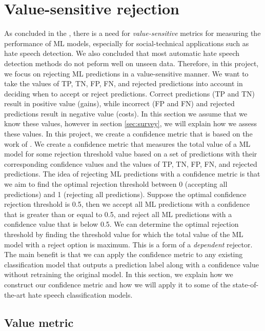 \chapter{Value-sensitive rejection}
As concluded in the , there is a need for \textit{value-sensitive} metrics for measuring the performance of ML models, especially for social-technical applications such as hate speech detection.
%
We also concluded that most automatic hate speech detection methods do not peform well on unseen data.
%
Therefore, in this project, we focus on rejecting ML predictions in a value-sensitive manner.
%
We want to take the values of TP, TN, FP, FN, and rejected predictions into account in deciding when to accept or reject predictions.
%
Correct predictions (TP and TN) result in positive value (gains), while incorrect (FP and FN) and rejected predictions result in negative value (costs).
%
In this section we assume that we know these values, however in section \ref{sec:survey}, we will explain how we assess these values.
%
In this project, we create a confidence metric that is based on the work of \citet{de2000reject}.
%
We create a confidence metric that measures the total value of a ML model for some rejection threshold value based on a set of predictions with their corresponding confidence values and the values of TP, TN, FP, FN, and rejected predictions.
%
The idea of rejecting ML predictions with a confidence metric is that we aim to find the optimal rejection threshold between 0 (accepting all predictions) and 1 (rejecting all predictions).
%
Suppose the optimal confidence rejection threshold is 0.5, then we accept all ML predictions with a confidence that is greater than or equal to 0.5, and reject all ML predictions with a confidence value that is below 0.5.
%
We can determine the optimal rejection threshold by finding the threshold value for which the total value of the ML model with a reject option is maximum.
%
This is a form of a \textit{dependent} rejector.
%
The main benefit is that we can apply the confidence metric to any existing classification model that outputs a prediction label along with a confidence value without retraining the original model.
%
In this section, we explain how we construct our confidence metric and how we will apply it to some of the state-of-the-art hate speech classification models.

\section{Value metric}

